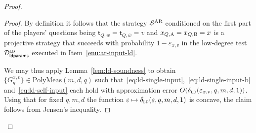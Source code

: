 \documentclass[11pt]{article}
\theoremstyle{definition}
\newcommand{\ol}[1]{\overline{#1}}
\newcommand{\ld}{\textsc{ld}}
\newcommand{\eps}{\varepsilon}
\newcommand{\sampler}{\mathcal{S}}
\newcommand{\decider}{\mathcal{D}}
\newcommand{\gamestyle}[1]{\ensuremath{\textsc{#1}}\xspace}
\newcommand{\ar}{\gamestyle{AR}}
\newcommand{\labelstyle}[1]{\ensuremath{\textsc{#1}}\xspace}
\newcommand{\tvarstyle}[1]{\mathsf{#1}}
\newcommand{\tvar}{\ensuremath{\tvarstyle{t}}}
\newcommand{\alice}{\labelstyle{A}}
\newcommand{\bob}{\labelstyle{B}}
\newcommand{\ldparams}{\mathsf{ldparams}}
\newcommand{\polymeas}[3]{\mathrm{PolyMeas}(#1,#2,#3)}
\begin{document}
\begin{proof}
\begin{proof}
    By definition it follows that the strategy $\sampler^\ar$ conditioned on the
    first part of the players' questions being $\tvar_{Q,w} = \tvar_{Q,\ol{w}} =
    v$ and $x_{Q,\alice}=x_{Q,\bob}=x$ is a projective strategy that succeeds
    with probability $1-\eps_{x,v}$ in the low-degree test
    $\decider^\ld_\ldparams$ executed in Item~\ref{enu:ar-input-ld}.
	
    We may thus apply Lemma~\ref{lem:ld-soundness} to obtain $\{G^{{x},v}_{g}\}
    \in \polymeas{m}{d}{q}$ such
    that~\eqref{eq:ld-single-input},~\eqref{eq:ld-single-input-b}
    and~\eqref{eq:ld-self-input} each hold with approximation error
    $O(\delta_{\ld}(\eps_{x,v},q,m,d,1))$.
    Using that for fixed $q,m,d$ the function
    $\eps\mapsto\delta_{\ld}(\eps,q,m,d,1)$ is concave, the claim follows from
    Jensen's inequality.
  \end{proof}


\end{proof}
\end{document}
